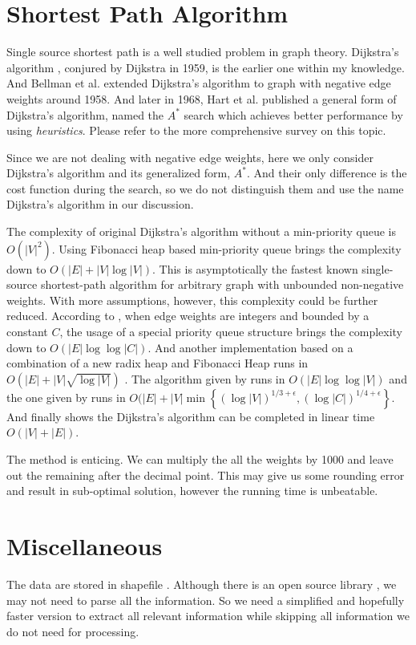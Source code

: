 \documentclass[11pt]{article}
\begin{document}
\section{Shortest Path Algorithm}
\label{sec-3}

Single source shortest path is a well studied problem in graph
theory.  Dijkstra's algorithm \cite{Dijkstra:1959}, conjured by
Dijkstra in 1959, is the earlier one within my knowledge.  And
Bellman et al. extended Dijkstra's algorithm to graph with negative
edge weights \cite{bellman:1958} around 1958.  And later in 1968,
Hart et al. published a general form of Dijkstra's algorithm, named
the \(A^*\) search which achieves better performance by using
\emph{heuristics}.  Please refer to the more comprehensive survey
\cite{Cherkassky:1996} on this topic.

Since we are not dealing with negative edge weights, here we only
consider Dijkstra's algorithm and its generalized form, \(A^*\).
And their only difference is the cost function during the search,
so we do not distinguish them and use the name Dijkstra's algorithm
in our discussion.

The complexity of original Dijkstra's algorithm without a
min-priority queue is \(O(|V|^2)\).  Using Fibonacci heap based
min-priority queue \cite{Fredman:1984} brings the complexity down
to \(O(|E| + |V|\log|V|)\).  This is asymptotically the fastest
known single-source shortest-path algorithm for arbitrary graph
with unbounded non-negative weights.  With more assumptions,
however, this complexity could be further reduced.  According to
\cite{Wikipedia:dijkstra}, when edge weights are integers and
bounded by a constant \(C\), the usage of a special priority queue
structure \cite{VanEmdeboas:1976} brings the complexity down to
\(O(|E|\log\log|C|)\).  And another implementation based on a
combination of a new radix heap and Fibonacci Heap runs in
\(O(|E| + |V|\sqrt{\log|V|})\) \cite{Ahuja:1990}.  The algorithm
given by \cite{Thorup:2000} runs in \(O(|E|\log\log|V|)\) and the
one given by \cite{Raman:1997} runs in
\(O(|E| + |V|\min{\left\{(\log|V|)^{1/3+\epsilon},
  (\log|C|)^{1/4+\epsilon}\right\}}\).  And finally
\cite{Thorup:1999} shows the Dijkstra's algorithm can be completed
in linear time \(O(|V|+|E|)\).

The method \cite{Thorup:1999} is enticing.  We can multiply the all
the weights by 1000 and leave out the remaining after the decimal
point.  This may give us some rounding error and result in
sub-optimal solution, however the running time is unbeatable.

\section{Miscellaneous}
\label{sec-4}

The data are stored in shapefile \cite{Wikipedia:shapefile}.
Although there is an open source library \cite{Warmerdam}, we may
not need to parse all the information.  So we need a simplified and
hopefully faster version to extract all relevant information while
skipping all information we do not need for processing.

\small\printbibliography
\end{document}
